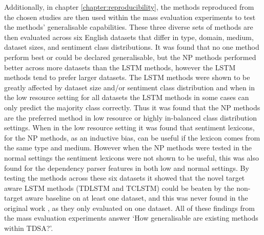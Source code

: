 Additionally, in chapter \ref{chapter:reproducibility}, the methods reproduced from the chosen studies are then used within the mass evaluation experiments to test the methods' generalisable capabilities. These three diverse sets of methods are then evaluated across six English datasets that differ in type, domain, medium, dataset sizes, and sentiment class distributions. It was found that no one method perform best or could be declared generalisable, but the NP methods performed better across more datasets than the LSTM methods, however the LSTM methods tend to prefer larger datasets. The LSTM methods were shown to be greatly affected by dataset size and/or sentiment class distribution and when in the low resource setting for all datasets the LSTM methods in some cases can only predict the majority class correctly. Thus it was found that the NP methods are the preferred method in low resource or highly in-balanced class distribution settings. When in the low resource setting it was found that sentiment lexicons, for the NP methods, as an inductive bias, can be useful if the lexicon comes from the same type and medium. However when the NP methods were tested in the normal settings the sentiment lexicons were not shown to be useful, this was also found for the dependency parser features in both low and normal settings. By testing the methods across these six datasets it showed that the novel target aware LSTM methods (TDLSTM and TCLSTM) could be beaten by the non-target aware baseline on at least one dataset, and this was never found in the original work \citep{tang-etal-2016-effective}, as they only evaluated on one dataset. All of these findings from the mass evaluation experiments answer  `How generalisable are existing methods within TDSA?'.

